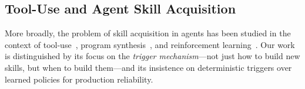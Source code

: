 \subsection{Tool-Use and Agent Skill Acquisition}

More broadly, the problem of skill acquisition in agents has been studied in
the context of tool-use~\cite{schick2024toolformer, qin2024toolllm},
program synthesis~\cite{chen2021evaluating}, and reinforcement
learning~\cite{sutton2018reinforcement}. Our work is distinguished by its
focus on the \emph{trigger mechanism}---not just how to build new skills, but
when to build them---and its insistence on deterministic triggers over learned
policies for production reliability.

